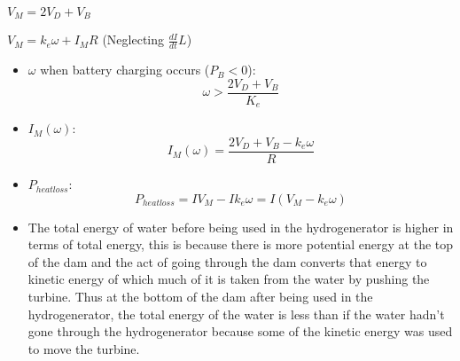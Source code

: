 \documentclass[12pt]{article}
\begin{document}
$V_M = 2V_D + V_B$

$V_M = k_e \omega + I_M R$ (Neglecting $\frac{dI}{dt}L$)


\begin{itemize}
    \item 
    $\omega$ when battery charging occurs ($P_B < 0$):
    \[
        \omega > \frac{2 V_D + V_B}{K_e}
    \]

    \item
    $I_M(\omega)$:
    \[
        I_M(\omega) = \frac{2 V_D + V_B - k_e \omega}{R}
    \]
    \item
    $P_{heat loss}$:
    \[
        P_{heat loss} = I V_M - I k_e \omega = I (V_M - k_e \omega)
    \]
    \item
    The total energy of water before being used in the hydrogenerator is higher in terms of total energy, this is because there is more potential energy at the top of the dam and the act of going through the dam converts that energy to kinetic energy of which much of it is taken from the water by pushing the turbine.
    Thus at the bottom of the dam after being used in the hydrogenerator, the total energy of the water is less than if the water hadn't gone through the hydrogenerator because some of the kinetic energy was used to move the turbine.

\end{itemize}
\end{document}
